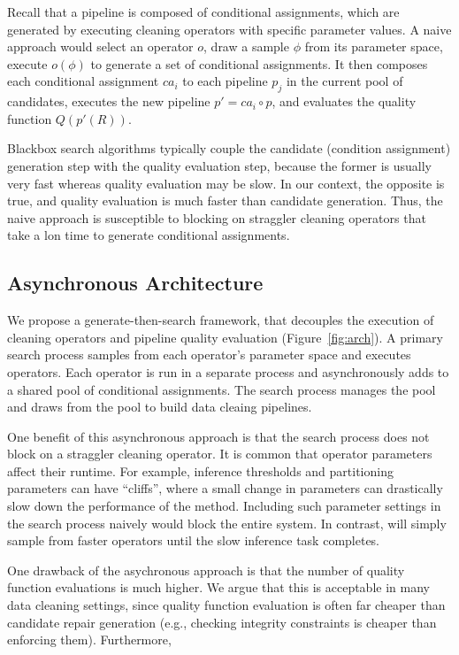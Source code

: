 Recall that a pipeline is composed of conditional assignments, which are generated by executing cleaning operators with specific parameter values.   A naive approach would select an operator $o$, draw a sample $\phi$ from its parameter space, execute $o(\phi)$ to generate a set of conditional assignments.      It then composes each conditional assignment $ca_i$ to each pipeline $p_j$ in the current pool of candidates, executes the new pipeline $p' = ca_i \circ p$, and evaluates the quality function $Q(p'(R))$.

Blackbox search algorithms typically couple the candidate (condition assignment) generation step with the quality evaluation step, because the former is usually very fast whereas quality evaluation may be slow.  In our context, the opposite is true, and quality evaluation is much faster than candidate generation.   Thus, the naive approach is susceptible to blocking on straggler cleaning operators that take a lon time to generate conditional assignments. 

\subsection{Asynchronous Architecture}

We propose a generate-then-search framework, that decouples the execution of cleaning operators and pipeline quality evaluation (Figure~\ref{fig:arch}).  A primary search process samples from each operator's parameter space and executes operators.  Each operator is run in a separate process and asynchronously adds to a shared pool of conditional assignments.  The search process manages the pool and draws from the pool to build data cleaing pipelines.  

One benefit of this asynchronous approach is that the search process does not block on a straggler cleaning operator.  It is common that operator parameters affect their runtime.  For example, inference thresholds and partitioning parameters can have ``cliffs'', where a small change in parameters can drastically slow down the performance of the method. Including such parameter settings in the search process naively would block the entire system.  In contrast, \sys will simply sample from faster operators until the slow inference task completes.  

One drawback of the asychronous approach is that the number of quality function evaluations is much higher. We argue that this is acceptable in many data cleaning settings, since quality function evaluation is often far cheaper than candidate repair generation (e.g., checking integrity constraints is cheaper than enforcing them). Furthermore, 



